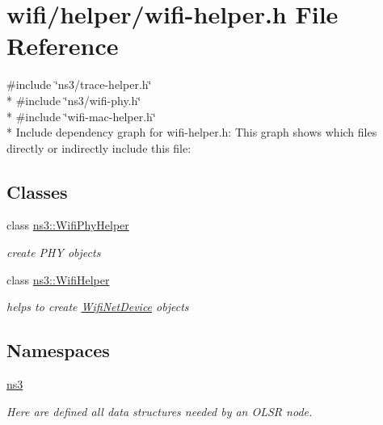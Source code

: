 \hypertarget{wifi-helper_8h}{}\section{wifi/helper/wifi-\/helper.h File Reference}
\label{wifi-helper_8h}
{\ttfamily \#include \char`\"{}ns3/trace-\/helper.\+h\char`\"{}}\\*
{\ttfamily \#include \char`\"{}ns3/wifi-\/phy.\+h\char`\"{}}\\*
{\ttfamily \#include \char`\"{}wifi-\/mac-\/helper.\+h\char`\"{}}\\*
Include dependency graph for wifi-\/helper.h\+:
This graph shows which files directly or indirectly include this file\+:
\subsection*{Classes}
\begin{DoxyCompactItemize}
\item 
class \hyperlink{classns3_1_1WifiPhyHelper}{ns3\+::\+Wifi\+Phy\+Helper}
\begin{DoxyCompactList}\small\item\em create P\+HY objects \end{DoxyCompactList}\item 
class \hyperlink{classns3_1_1WifiHelper}{ns3\+::\+Wifi\+Helper}
\begin{DoxyCompactList}\small\item\em helps to create \hyperlink{classns3_1_1WifiNetDevice}{Wifi\+Net\+Device} objects \end{DoxyCompactList}\end{DoxyCompactItemize}
\subsection*{Namespaces}
\begin{DoxyCompactItemize}
\item 
 \hyperlink{namespacens3}{ns3}
\begin{DoxyCompactList}\small\item\em Here are defined all data structures needed by an O\+L\+SR node. \end{DoxyCompactList}\end{DoxyCompactItemize}
